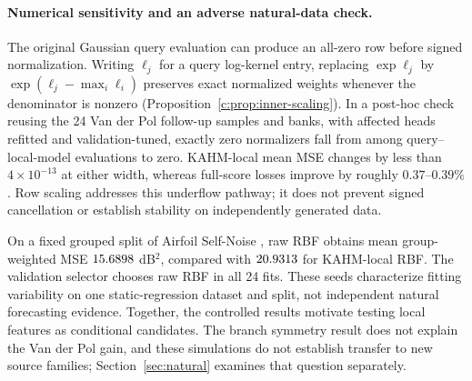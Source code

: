 \paragraph{Numerical sensitivity and an adverse natural-data check.}
\label{c:sec:numerical}
The original Gaussian query evaluation can produce an all-zero row before
signed normalization. Writing $\ell_j$ for a query log-kernel entry, replacing
$\exp\ell_j$ by
$\exp(\ell_j-\max_i\ell_i)$ preserves exact normalized weights whenever
the denominator is nonzero (Proposition~\ref{c:prop:inner-scaling}). In a
post-hoc check reusing the 24 Van der Pol follow-up samples and banks, with
affected heads refitted and validation-tuned, exactly zero normalizers fall
from \NumericalOriginalZeroCount{} among \NumericalQueryClusterCount{}
query--local-model evaluations to zero. KAHM-local mean MSE changes by
less than $4\times10^{-13}$ at either width, whereas full-score losses
improve by roughly $0.37$--$0.39\%$. Row scaling addresses this underflow
pathway; it does not prevent signed cancellation or establish stability on independently generated data.

On a fixed grouped split of Airfoil Self-Noise \citep{Brooks1989Airfoil},
raw RBF obtains mean group-weighted MSE $15.6898$ dB$^2$,
compared with $20.9313$ for KAHM-local RBF. The validation selector chooses
raw RBF in all 24 fits. These seeds characterize fitting variability on
one static-regression dataset and split, not independent natural
forecasting evidence. Together, the controlled results motivate testing
local features as conditional candidates. The branch symmetry result does not explain the Van der Pol gain,
and these simulations do not establish transfer to new source families;
Section~\ref{sec:natural} examines that question separately.
